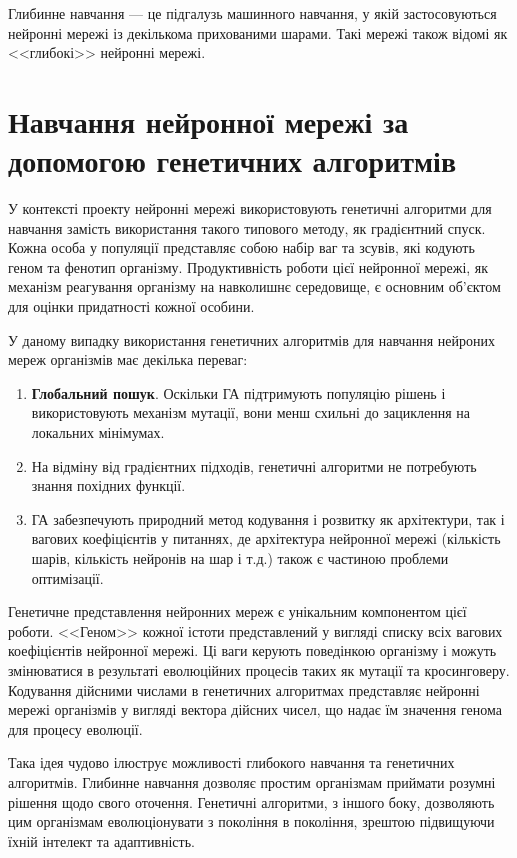 Глибинне навчання --- це підгалузь машинного навчання, 
у якій застосовуються нейронні мережі із 
декількома прихованими шарами.
Такі мережі також відомі як <<глибокі>> нейронні мережі. 



\section{Навчання нейронної мережі за допомогою генетичних алгоритмів}

У контексті проекту нейронні мережі використовують
генетичні алгоритми для навчання замість використання
такого типового методу, як градієнтний спуск.
Кожна особа у популяції представляє собою набір ваг та зсувів,
які кодують геном та фенотип організму.
Продуктивність роботи цієї нейронної мережі, як механізм
реагування організму на навколишнє середовище,
є основним об'єктом для оцінки придатності кожної особини.

У даному випадку використання генетичних алгоритмів для
навчання нейроних мереж організмів має декілька переваг:
\begin{enumerate}
  \item \textbf{Глобальний пошук}. Оскільки ГА підтримують популяцію рішень
    і використовують механізм мутації,
    вони менш схильні до зациклення на локальних мінімумах.
  \item На відміну від градієнтних підходів, 
    генетичні алгоритми не потребують знання похідних функції.
  \item ГА забезпечують природний метод 
    кодування і розвитку як архітектури, 
    так і вагових коефіцієнтів у питаннях, 
    де архітектура нейронної мережі 
    (кількість шарів, кількість нейронів на шар і т.д.) 
    також є частиною проблеми оптимізації.
\end{enumerate}

Генетичне представлення нейронних мереж є 
унікальним компонентом цієї роботи. 
<<Геном>> кожної істоти представлений у вигляді списку 
всіх вагових коефіцієнтів нейронної мережі. 
Ці ваги керують поведінкою організму і можуть змінюватися 
в результаті еволюційних процесів
таких як мутації та кросинговеру. 
Кодування дійсними числами в генетичних алгоритмах 
представляє нейронні мережі організмів у вигляді вектора дійсних чисел,
що надає їм значення генома для процесу еволюції.


Така ідея чудово ілюструє можливості 
глибокого навчання та генетичних алгоритмів. 
Глибинне навчання дозволяє простим організмам приймати 
розумні рішення щодо свого оточення. 
Генетичні алгоритми, з іншого боку, 
дозволяють цим організмам еволюціонувати з покоління в покоління, 
зрештою підвищуючи їхній інтелект та адаптивність. 



